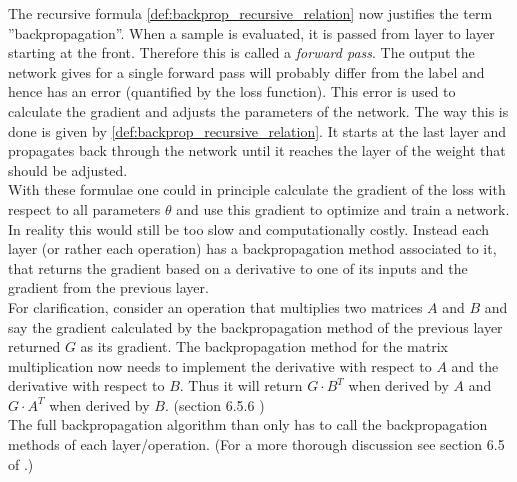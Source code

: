 The recursive formula \eqref{def:backprop_recursive_relation} now justifies the term ''backpropagation''. When a sample is evaluated, it is passed from layer to layer starting at the front. Therefore this is called a \emph{forward pass}. The output the network gives for a single forward pass will probably differ from the label and hence has an error (quantified by the loss function). This error is used to calculate the gradient and adjusts the parameters of the network. The way this is done is given by \eqref{def:backprop_recursive_relation}. It starts at the last layer and propagates back through the network until it reaches the layer of the weight that should be adjusted.\\
With these formulae one could in principle calculate the gradient of the loss with respect to all parameters $\theta$ and use this gradient to optimize and train a network. In reality this would still be too slow and computationally costly. Instead each layer (or rather each operation) has a backpropagation method associated to it, that returns the gradient based on a derivative to one of its inputs and the gradient from the previous layer.\\
For clarification, consider an operation that multiplies two matrices $A$ and $B$ and say the gradient calculated by the backpropagation method of the previous layer returned $G$ as its gradient. The backpropagation method for the matrix multiplication now needs to implement the derivative with respect to $A$ and the derivative with respect to $B$. Thus it will return $G\cdot B^T$ when derived by $A$ and $G\cdot A^T$ when derived by $B$. (section 6.5.6 \cite{deep_learning_book})\\
The full backpropagation algorithm than only has to call the backpropagation methods of each layer/operation. (For a more thorough discussion see section 6.5 of \cite{deep_learning_book}.)

